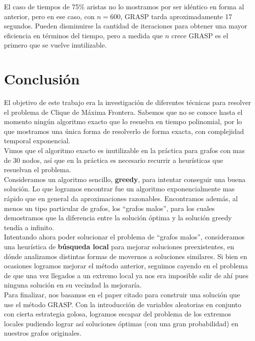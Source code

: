 El caso de tiempos de 75\% aristas no lo mostramos por ser idéntico en forma al anterior, pero en ese caso, con $n = 600$, GRASP tarda aproximadamente 17 segundos. Pueden disminuirse la cantidad de iteraciones para obtener una mayor eficiencia en términos del tiempo, pero a medida que $n$ crece GRASP es el primero que se vuelve inutilizable.



\section{Conclusión}

El objetivo de este trabajo era la investigación de diferentes técnicas para resolver el problema de Clique de Máxima Frontera. Sabemos que no se conoce hasta el momento ningún algoritmo exacto que lo resuelva en tiempo polinomial, por lo que mostramos una única forma de resolverlo de forma exacta, con complejidad temporal exponencial. \\

Vimos que el algoritmo exacto es inutilizable en la práctica para grafos con mas de 30 nodos, así que en la práctica es necesario recurrir a heurísticas que resuelvan el problema. \\

Consideramos un algoritmo sencillo, \textbf{greedy}, para intentar conseguir una buena solución. Lo que logramos encontrar fue un algoritmo exponencialmente mas rápido que en general da aproximaciones razonables. Encontramos además, al menos un tipo particular de grafos, los ``grafos malos'', para los cuales demostramos que la diferencia entre la solución óptima y la solución greedy tendía a infinito. \\

Intentando ahora poder solucionar el problema de ``grafos malos'', consideramos una heurística de \textbf{búsqueda local} para mejorar soluciones preexistentes, en dónde analizamos distintas formas de movernos a soluciones similares. Si bien en ocasiones logramos mejorar el método anterior, seguimos cayendo en el problema de que una vez llegados a un extremo local ya nos era imposible salir de ahí pues ninguna solución en su vecindad la mejoraría. \\

Para finalizar, nos basamos en el paper citado \cite{paper_grasp} para construir una solución que use el método GRASP. Con la introducción de variables aleatorias en conjunto con cierta estrategia golosa, logramos escapar del problema de los extremos locales pudiendo lograr así soluciones óptimas (con una gran probabilidad) en nuestros grafos originales. \\

